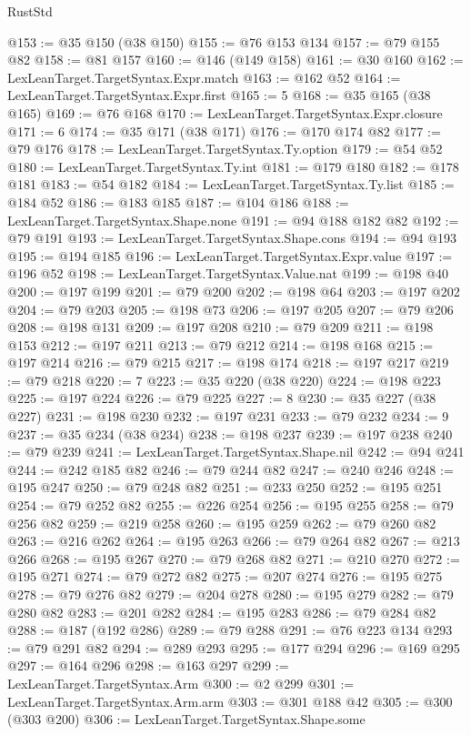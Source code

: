 \begin{lexlean}{RustStd}
\begin{coremodule}
@153 := @35 @150 (@38 @150)
@155 := @76 @153 @134
@157 := @79 @155 @82
@158 := @81 @157
@160 := @146 (@149 @158)
@161 := @30 @160
@162 := LexLeanTarget.TargetSyntax.Expr.match
@163 := @162 @52
@164 := LexLeanTarget.TargetSyntax.Expr.first
@165 := 5
@168 := @35 @165 (@38 @165)
@169 := @76 @168
@170 := LexLeanTarget.TargetSyntax.Expr.closure
@171 := 6
@174 := @35 @171 (@38 @171)
@176 := @170 @174 @82
@177 := @79 @176
@178 := LexLeanTarget.TargetSyntax.Ty.option
@179 := @54 @52
@180 := LexLeanTarget.TargetSyntax.Ty.int
@181 := @179 @180
@182 := @178 @181
@183 := @54 @182
@184 := LexLeanTarget.TargetSyntax.Ty.list
@185 := @184 @52
@186 := @183 @185
@187 := @104 @186
@188 := LexLeanTarget.TargetSyntax.Shape.none
@191 := @94 @188 @182 @82
@192 := @79 @191
@193 := LexLeanTarget.TargetSyntax.Shape.cons
@194 := @94 @193
@195 := @194 @185
@196 := LexLeanTarget.TargetSyntax.Expr.value
@197 := @196 @52
@198 := LexLeanTarget.TargetSyntax.Value.nat
@199 := @198 @40
@200 := @197 @199
@201 := @79 @200
@202 := @198 @64
@203 := @197 @202
@204 := @79 @203
@205 := @198 @73
@206 := @197 @205
@207 := @79 @206
@208 := @198 @131
@209 := @197 @208
@210 := @79 @209
@211 := @198 @153
@212 := @197 @211
@213 := @79 @212
@214 := @198 @168
@215 := @197 @214
@216 := @79 @215
@217 := @198 @174
@218 := @197 @217
@219 := @79 @218
@220 := 7
@223 := @35 @220 (@38 @220)
@224 := @198 @223
@225 := @197 @224
@226 := @79 @225
@227 := 8
@230 := @35 @227 (@38 @227)
@231 := @198 @230
@232 := @197 @231
@233 := @79 @232
@234 := 9
@237 := @35 @234 (@38 @234)
@238 := @198 @237
@239 := @197 @238
@240 := @79 @239
@241 := LexLeanTarget.TargetSyntax.Shape.nil
@242 := @94 @241
@244 := @242 @185 @82
@246 := @79 @244 @82
@247 := @240 @246
@248 := @195 @247
@250 := @79 @248 @82
@251 := @233 @250
@252 := @195 @251
@254 := @79 @252 @82
@255 := @226 @254
@256 := @195 @255
@258 := @79 @256 @82
@259 := @219 @258
@260 := @195 @259
@262 := @79 @260 @82
@263 := @216 @262
@264 := @195 @263
@266 := @79 @264 @82
@267 := @213 @266
@268 := @195 @267
@270 := @79 @268 @82
@271 := @210 @270
@272 := @195 @271
@274 := @79 @272 @82
@275 := @207 @274
@276 := @195 @275
@278 := @79 @276 @82
@279 := @204 @278
@280 := @195 @279
@282 := @79 @280 @82
@283 := @201 @282
@284 := @195 @283
@286 := @79 @284 @82
@288 := @187 (@192 @286)
@289 := @79 @288
@291 := @76 @223 @134
@293 := @79 @291 @82
@294 := @289 @293
@295 := @177 @294
@296 := @169 @295
@297 := @164 @296
@298 := @163 @297
@299 := LexLeanTarget.TargetSyntax.Arm
@300 := @2 @299
@301 := LexLeanTarget.TargetSyntax.Arm.arm
@303 := @301 @188 @42
@305 := @300 (@303 @200)
@306 := LexLeanTarget.TargetSyntax.Shape.some

\end{coremodule}
\end{lexlean}
